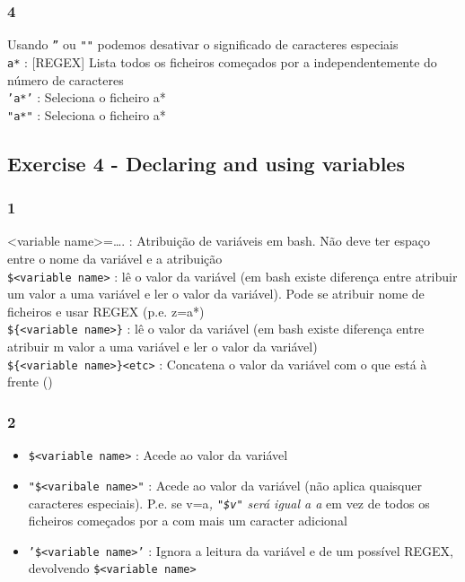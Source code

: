 \documentclass[]{article}
\begin{document}
\subsubsection{4}\label{section-7}

Usando \texttt{''} ou \texttt{""} podemos desativar o significado de
caracteres especiais\\\texttt{a*} : {[}REGEX{]} Lista todos os ficheiros
começados por a independentemente do número de caracteres\\\texttt{'a*'}
: Seleciona o ficheiro a*\\\texttt{"a*"} : Seleciona o ficheiro a*

\subsection{Exercise 4 - Declaring and using
variables}\label{exercise-4---declaring-and-using-variables}

\subsubsection{1}\label{section-8}

\textless{}variable name\textgreater{}=\ldots{}. : Atribuição de
variáveis em bash. Não deve ter espaço entre o nome da variável e a
atribuição\\\texttt{\$\textless{}variable name\textgreater{}} : lê o
valor da variável (em bash existe diferença entre atribuir um valor a
uma variável e ler o valor da variável). Pode se atribuir nome de
ficheiros e usar REGEX (p.e.
z=a*)\\\texttt{\$\{\textless{}variable name\textgreater{}\}} : lê o
valor da variável (em bash existe diferença entre atribuir m valor a uma
variável e ler o valor da
variável)\\\texttt{\$\{\textless{}variable name\textgreater{}\}\textless{}etc\textgreater{}}
: Concatena o valor da variável com o que está à frente ()

\subsubsection{2}\label{section-9}

\begin{itemize}
\itemsep1pt\parskip0pt
\item
  \texttt{\$\textless{}variable name\textgreater{}} : Acede ao valor da
  variável\\
\item
  \texttt{"\$\textless{}varibale name\textgreater{}"} : Acede ao valor
  da variável (não aplica quaisquer caracteres especiais). P.e. se
  v=a\emph{, \texttt{"\$v"} será igual a a} em vez de todos os ficheiros
  começados por a com mais um caracter adicional\\
\item
  \texttt{'\$\textless{}variable name\textgreater{}'} : Ignora a leitura
  da variável e de um possível REGEX, devolvendo
  \texttt{\$\textless{}variable name\textgreater{}}\\
\end{itemize}
\end{document}
